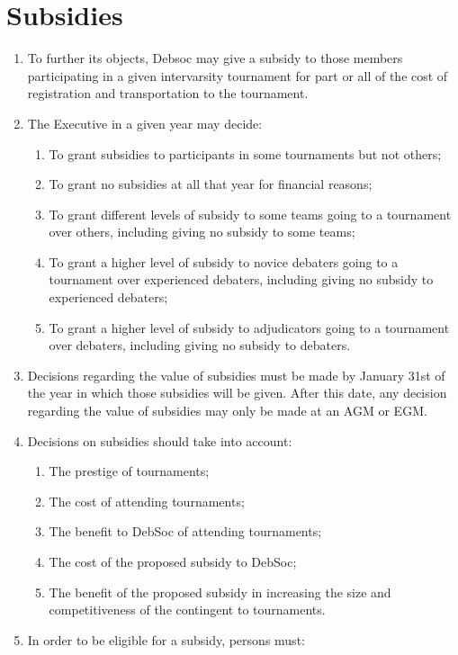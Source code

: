 \newpage
\section{Subsidies}

\begin{enumerate}
\item To further its objects, Debsoc may give a subsidy to those members participating in a given intervarsity tournament for part or all of the cost of registration and transportation to the tournament.
\item The Executive in a given year may decide:
  \begin{enumerate}
  \item To grant subsidies to participants in some tournaments but not others;
  \item To grant no subsidies at all that year for financial reasons;
  \item To grant different levels of subsidy to some teams going to a tournament over others, including giving no subsidy to some teams;
  \item To grant a higher level of subsidy to novice debaters going to a tournament over experienced debaters, including giving no subsidy to experienced debaters;
  \item To grant a higher level of subsidy to adjudicators going to a tournament over debaters, including giving no subsidy to debaters.
  \end{enumerate}
\item Decisions regarding the value of subsidies must be made by January 31st of the year in which those subsidies will be given. After this date, any decision regarding the value of subsidies may only be made at an AGM or EGM. \label{subsidy_determination_deadline}
\item Decisions on subsidies should take into account:
  \begin{enumerate}
  \item The prestige of tournaments;
  \item The cost of attending tournaments;
  \item The benefit to DebSoc of attending tournaments;
  \item The cost of the proposed subsidy to DebSoc;
  \item The benefit of the proposed subsidy in increasing the size and competitiveness of the contingent to tournaments.
  \end{enumerate}
\item In order to be eligible for a subsidy, persons must:

\end{enumerate}
